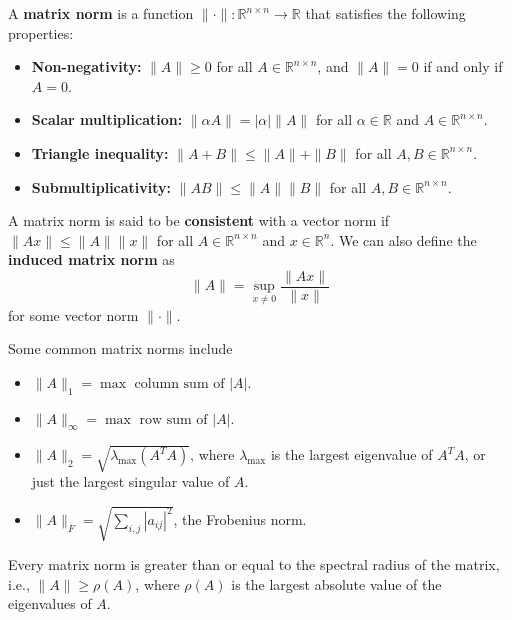\documentclass{matharticle}
\begin{document}
\begin{definition}
	A \textbf{matrix norm} is a function $\|\cdot\|: \mathbb{R}^{n \times n} \to \mathbb{R}$ that satisfies the following properties:
	\begin{itemize}
		\item \textbf{Non-negativity:} $\|A\| \geq 0$ for all $A \in \mathbb{R}^{n \times n}$, and $\|A\| = 0$ if and only if $A = 0$.
		\item \textbf{Scalar multiplication:} $\|\alpha A\| = |\alpha| \|A\|$ for all $\alpha \in \mathbb{R}$ and $A \in \mathbb{R}^{n \times n}$.
		\item \textbf{Triangle inequality:} $\|A + B\| \leq \|A\| + \|B\|$ for all $A, B \in \mathbb{R}^{n \times n}$.
		\item \textbf{Submultiplicativity:} $\|AB\| \leq \|A\| \|B\|$ for all $A, B \in \mathbb{R}^{n \times n}$.
	\end{itemize}

	A matrix norm is said to be \textbf{consistent} with a vector norm if $\|Ax\| \leq \|A\| \|x\|$ for all $A \in \mathbb{R}^{n \times n}$ and $x \in \mathbb{R}^n$. We can also define the \textbf{induced matrix norm} as
	\begin{equation}
		\|A\| = \sup_{x \neq 0} \frac{\|Ax\|}{\|x\|}
	\end{equation}
	for some vector norm $\|\cdot\|$.
\end{definition}

Some common matrix norms include
\begin{itemize}
	\item $\|A\|_1 = \max \text{ column sum of } |A|$.
	\item $\|A\|_\infty = \max \text{ row sum of } |A|$.
	\item $\|A\|_2 = \sqrt{\lambda_{\max}(A^T A)}$, where $\lambda_{\max}$ is the largest eigenvalue of $A^T A$, or just the largest singular value of $A$.
	\item $\|A\|_F = \sqrt{\sum_{i,j} |a_{ij}|^2}$, the Frobenius norm.
\end{itemize}

\begin{theorem}
	Every matrix norm is greater than or equal to the spectral radius of the matrix, i.e., $\|A\| \geq \rho(A)$, where $\rho(A)$ is the largest absolute value of the eigenvalues of $A$.
\end{theorem}
\end{document}
